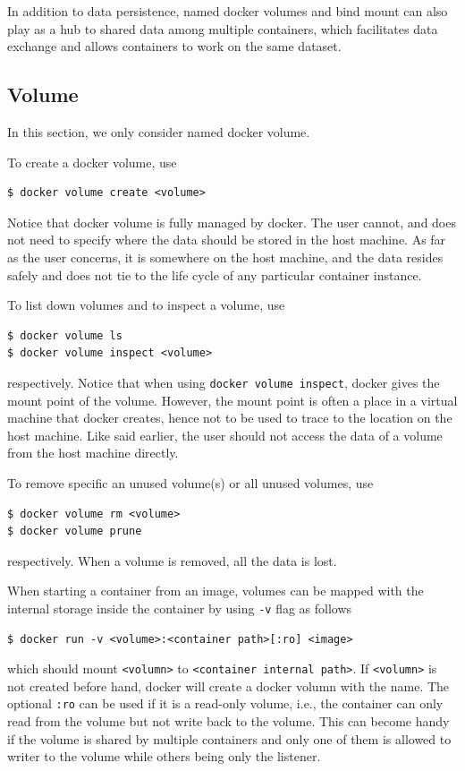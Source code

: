In addition to data persistence, named docker volumes and bind mount can also play as a hub to shared data among multiple containers, which facilitates data exchange and allows containers to work on the same dataset. 

\subsection{Volume}

In this section, we only consider named docker volume.

To create a docker volume, use
\begin{lstlisting}
$ docker volume create <volume>
\end{lstlisting}
Notice that docker volume is fully managed by docker. The user cannot, and does not need to specify where the data should be stored in the host machine. As far as the user concerns, it is somewhere on the host machine, and the data resides safely and does not tie to the life cycle of any particular container instance.

To list down volumes and to inspect a volume, use
\begin{lstlisting}
$ docker volume ls
$ docker volume inspect <volume>
\end{lstlisting}
respectively. Notice that when using \verb|docker volume inspect|, docker gives the mount point of the volume. However, the mount point is often a place in a virtual machine that docker creates, hence not to be used to trace to the location on the host machine. Like said earlier, the user should not access the data of a volume from the host machine directly.

To remove specific an unused volume(s) or all unused volumes, use
\begin{lstlisting}
$ docker volume rm <volume>
$ docker volume prune
\end{lstlisting}
respectively. When a volume is removed, all the data is lost.

When starting a container from an image, volumes can be mapped with the internal storage inside the container by using \verb|-v| flag as follows
\begin{lstlisting}
$ docker run -v <volume>:<container path>[:ro] <image>
\end{lstlisting}
which should mount \verb|<volumn>| to \verb|<container internal path>|. If \verb|<volumn>| is not created before hand, docker will create a docker volumn with the name. The optional \verb|:ro| can be used if it is a read-only volume, i.e., the container can only read from the volume but not write back to the volume. This can become handy if the volume is shared by multiple containers and only one of them is allowed to writer to the volume while others being only the listener.

